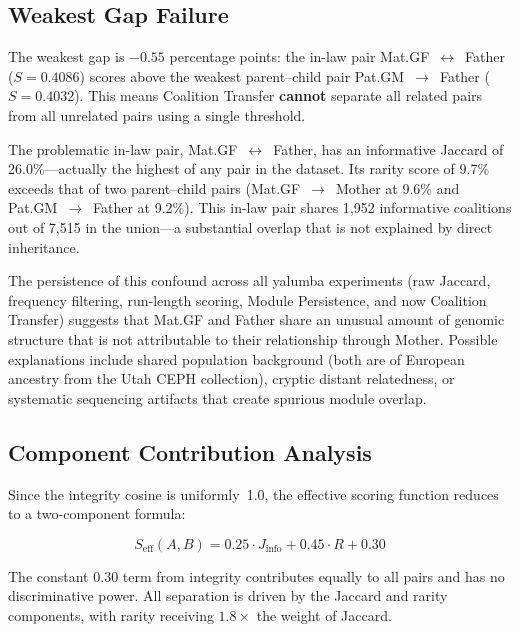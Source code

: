 \documentclass{../yalumba}
\begin{document}
\subsection{Weakest Gap Failure}
\label{sec:results-gap}

\begin{limitation}
The weakest gap is $-0.55$ percentage points: the in-law pair
Mat.GF~$\leftrightarrow$~Father ($S = 0.4086$) scores above the weakest
parent--child pair Pat.GM~$\to$~Father ($S = 0.4032$).  This means Coalition
Transfer \textbf{cannot} separate all related pairs from all unrelated pairs
using a single threshold.
\end{limitation}

The problematic in-law pair, Mat.GF~$\leftrightarrow$~Father, has an
informative Jaccard of 26.0\%---actually the highest of any pair in the
dataset.  Its rarity score of 9.7\% exceeds that of two parent--child pairs
(Mat.GF~$\to$~Mother at 9.6\% and Pat.GM~$\to$~Father at 9.2\%).  This
in-law pair shares 1{,}952 informative coalitions out of 7{,}515 in the
union---a substantial overlap that is not explained by direct inheritance.

The persistence of this confound across all yalumba experiments (raw Jaccard,
frequency filtering, run-length scoring, Module Persistence, and now Coalition
Transfer) suggests that Mat.GF and Father share an unusual amount of genomic
structure that is not attributable to their relationship through Mother.
Possible explanations include shared population background (both are of
European ancestry from the Utah CEPH collection), cryptic distant relatedness,
or systematic sequencing artifacts that create spurious module overlap.

\subsection{Component Contribution Analysis}
\label{sec:results-components}

Since the integrity cosine is uniformly~1.0, the effective scoring function
reduces to a two-component formula:

\begin{equation}
  S_{\mathrm{eff}}(A, B) = 0.25 \cdot J_{\mathrm{info}} + 0.45 \cdot R + 0.30
  \label{eq:effective-score}
\end{equation}

The constant $0.30$ term from integrity contributes equally to all pairs and
has no discriminative power.  All separation is driven by the Jaccard and
rarity components, with rarity receiving $1.8{\times}$ the weight of Jaccard.
\end{document}
